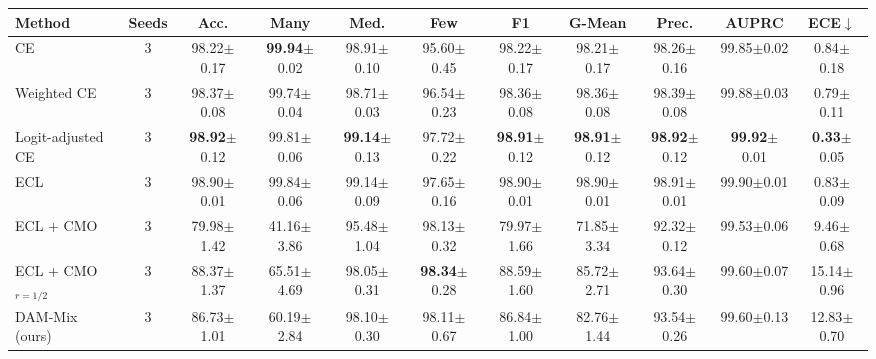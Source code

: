 \begin{tabular}{l c ccccccccc}
\toprule
Method & Seeds & Acc. & Many & Med. & Few & F1 & G-Mean & Prec. & AUPRC & ECE$\downarrow$ \\
\midrule
CE & 3 & 98.22{\scriptsize$\pm$0.17} & \textbf{99.94}{\scriptsize$\pm$0.02} & 98.91{\scriptsize$\pm$0.10} & 95.60{\scriptsize$\pm$0.45} & 98.22{\scriptsize$\pm$0.17} & 98.21{\scriptsize$\pm$0.17} & 98.26{\scriptsize$\pm$0.16} & 99.85{\scriptsize$\pm$0.02} & 0.84{\scriptsize$\pm$0.18} \\
Weighted CE & 3 & 98.37{\scriptsize$\pm$0.08} & 99.74{\scriptsize$\pm$0.04} & 98.71{\scriptsize$\pm$0.03} & 96.54{\scriptsize$\pm$0.23} & 98.36{\scriptsize$\pm$0.08} & 98.36{\scriptsize$\pm$0.08} & 98.39{\scriptsize$\pm$0.08} & 99.88{\scriptsize$\pm$0.03} & 0.79{\scriptsize$\pm$0.11} \\
Logit-adjusted CE & 3 & \textbf{98.92}{\scriptsize$\pm$0.12} & 99.81{\scriptsize$\pm$0.06} & \textbf{99.14}{\scriptsize$\pm$0.13} & 97.72{\scriptsize$\pm$0.22} & \textbf{98.91}{\scriptsize$\pm$0.12} & \textbf{98.91}{\scriptsize$\pm$0.12} & \textbf{98.92}{\scriptsize$\pm$0.12} & \textbf{99.92}{\scriptsize$\pm$0.01} & \textbf{0.33}{\scriptsize$\pm$0.05} \\
ECL & 3 & 98.90{\scriptsize$\pm$0.01} & 99.84{\scriptsize$\pm$0.06} & 99.14{\scriptsize$\pm$0.09} & 97.65{\scriptsize$\pm$0.16} & 98.90{\scriptsize$\pm$0.01} & 98.90{\scriptsize$\pm$0.01} & 98.91{\scriptsize$\pm$0.01} & 99.90{\scriptsize$\pm$0.01} & 0.83{\scriptsize$\pm$0.09} \\
ECL + CMO & 3 & 79.98{\scriptsize$\pm$1.42} & 41.16{\scriptsize$\pm$3.86} & 95.48{\scriptsize$\pm$1.04} & 98.13{\scriptsize$\pm$0.32} & 79.97{\scriptsize$\pm$1.66} & 71.85{\scriptsize$\pm$3.34} & 92.32{\scriptsize$\pm$0.12} & 99.53{\scriptsize$\pm$0.06} & 9.46{\scriptsize$\pm$0.68} \\
ECL + CMO$_{r=1/2}$ & 3 & 88.37{\scriptsize$\pm$1.37} & 65.51{\scriptsize$\pm$4.69} & 98.05{\scriptsize$\pm$0.31} & \textbf{98.34}{\scriptsize$\pm$0.28} & 88.59{\scriptsize$\pm$1.60} & 85.72{\scriptsize$\pm$2.71} & 93.64{\scriptsize$\pm$0.30} & 99.60{\scriptsize$\pm$0.07} & 15.14{\scriptsize$\pm$0.96} \\
\midrule
DAM-Mix (ours) & 3 & 86.73{\scriptsize$\pm$1.01} & 60.19{\scriptsize$\pm$2.84} & 98.10{\scriptsize$\pm$0.30} & 98.11{\scriptsize$\pm$0.67} & 86.84{\scriptsize$\pm$1.00} & 82.76{\scriptsize$\pm$1.44} & 93.54{\scriptsize$\pm$0.26} & 99.60{\scriptsize$\pm$0.13} & 12.83{\scriptsize$\pm$0.70} \\
\bottomrule
\end{tabular}
